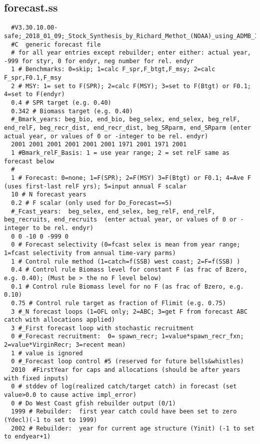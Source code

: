 \begin{landscape}
\subsection{forecast.ss}
\scriptsize{
\begin{verbatim}
  #V3.30.10.00-safe;_2018_01_09;_Stock_Synthesis_by_Richard_Methot_(NOAA)_using_ADMB_11.6
  #C  generic forecast file
  # for all year entries except rebuilder; enter either: actual year, -999 for styr, 0 for endyr, neg number for rel. endyr
  1 # Benchmarks: 0=skip; 1=calc F_spr,F_btgt,F_msy; 2=calc F_spr,F0.1,F_msy 
  2 # MSY: 1= set to F(SPR); 2=calc F(MSY); 3=set to F(Btgt) or F0.1; 4=set to F(endyr) 
  0.4 # SPR target (e.g. 0.40)
  0.342 # Biomass target (e.g. 0.40)
  #_Bmark_years: beg_bio, end_bio, beg_selex, end_selex, beg_relF, end_relF, beg_recr_dist, end_recr_dist, beg_SRparm, end_SRparm (enter actual year, or values of 0 or -integer to be rel. endyr)
  2001 2001 2001 2001 2001 2001 1971 2001 1971 2001
  1 #Bmark_relF_Basis: 1 = use year range; 2 = set relF same as forecast below
  #
  1 # Forecast: 0=none; 1=F(SPR); 2=F(MSY) 3=F(Btgt) or F0.1; 4=Ave F (uses first-last relF yrs); 5=input annual F scalar
  10 # N forecast years 
  0.2 # F scalar (only used for Do_Forecast==5)
  #_Fcast_years:  beg_selex, end_selex, beg_relF, end_relF, beg_recruits, end_recruits  (enter actual year, or values of 0 or -integer to be rel. endyr)
  0 0 -10 0 -999 0
  0 # Forecast selectivity (0=fcast selex is mean from year range; 1=fcast selectivity from annual time-vary parms)
  1 # Control rule method (1=catch=f(SSB) west coast; 2=F=f(SSB) ) 
  0.4 # Control rule Biomass level for constant F (as frac of Bzero, e.g. 0.40); (Must be > the no F level below) 
  0.1 # Control rule Biomass level for no F (as frac of Bzero, e.g. 0.10) 
  0.75 # Control rule target as fraction of Flimit (e.g. 0.75) 
  3 #_N forecast loops (1=OFL only; 2=ABC; 3=get F from forecast ABC catch with allocations applied)
  3 #_First forecast loop with stochastic recruitment
  0 #_Forecast recruitment:  0= spawn_recr; 1=value*spawn_recr_fxn; 2=value*VirginRecr; 3=recent mean) 
  1 # value is ignored 
  0 #_Forecast loop control #5 (reserved for future bells&whistles) 
  2010  #FirstYear for caps and allocations (should be after years with fixed inputs) 
  0 # stddev of log(realized catch/target catch) in forecast (set value>0.0 to cause active impl_error)
  0 # Do West Coast gfish rebuilder output (0/1) 
  1999 # Rebuilder:  first year catch could have been set to zero (Ydecl)(-1 to set to 1999)
  2002 # Rebuilder:  year for current age structure (Yinit) (-1 to set to endyear+1)

\end{verbatim}}
\end{landscape}
